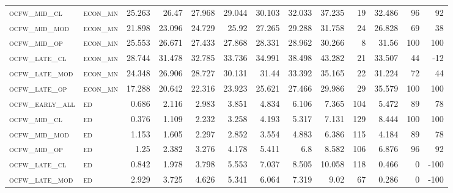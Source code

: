 \begin{landscape}
\begin{center}
\begin{footnotesize}
\begin{longtable}{llrrrrrrrr|rrr}
\textsc{ocfw\_mid\_cl   } & \textsc{econ\_mn  }   & 25.263   & 26.47    & 27.968   & 29.044   & 30.103   & 32.033   & 37.235   & 19     & 32.486        & 96            & 92              \\
\textsc{ocfw\_mid\_mod  } & \textsc{econ\_mn  }   & 21.898   & 23.096   & 24.729   & 25.92    & 27.265   & 29.288   & 31.758   & 24     & 26.828        & 69            & 38              \\
\textsc{ocfw\_mid\_op   } & \textsc{econ\_mn  }   & 25.553   & 26.671   & 27.433   & 27.868   & 28.331   & 28.962   & 30.266   & 8      & 31.56         & 100           & 100             \\
\textsc{ocfw\_late\_cl  } & \textsc{econ\_mn  }   & 28.744   & 31.478   & 32.785   & 33.736   & 34.991   & 38.498   & 43.282   & 21     & 33.507        & 44            & -12             \\
\textsc{ocfw\_late\_mod } & \textsc{econ\_mn  }   & 24.348   & 26.906   & 28.727   & 30.131   & 31.44    & 33.392   & 35.165   & 22     & 31.224        & 72            & 44              \\
\textsc{ocfw\_late\_op  } & \textsc{econ\_mn  }   & 17.288   & 20.642   & 22.316   & 23.923   & 25.621   & 27.466   & 29.986   & 29     & 35.579        & 100           & 100             \\
\textsc{ocfw\_early\_all} & \textsc{ed        }   & 0.686    & 2.116    & 2.983    & 3.851    & 4.834    & 6.106    & 7.365    & 104    & 5.472         & 89            & 78              \\
\textsc{ocfw\_mid\_cl   } & \textsc{ed        }   & 0.376    & 1.109    & 2.232    & 3.258    & 4.193    & 5.317    & 7.131    & 129    & 8.444         & 100           & 100             \\
\textsc{ocfw\_mid\_mod  } & \textsc{ed        }   & 1.153    & 1.605    & 2.297    & 2.852    & 3.554    & 4.883    & 6.386    & 115    & 4.184         & 89            & 78              \\
\textsc{ocfw\_mid\_op   } & \textsc{ed        }   & 1.25     & 2.382    & 3.276    & 4.178    & 5.411    & 6.8      & 8.582    & 106    & 6.876         & 96            & 92              \\
\textsc{ocfw\_late\_cl  } & \textsc{ed        }   & 0.842    & 1.978    & 3.798    & 5.553    & 7.037    & 8.505    & 10.058   & 118    & 0.466         & 0             & -100            \\
\textsc{ocfw\_late\_mod } & \textsc{ed        }   & 2.929    & 3.725    & 4.626    & 5.341    & 6.064    & 7.319    & 9.02     & 67     & 0.286         & 0             & -100            \\

\end{longtable}
\end{footnotesize}
\end{center}
\end{landscape}
